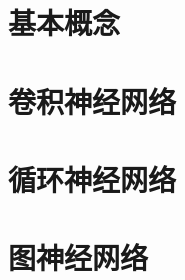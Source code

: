 \documentclass[11pt,oneside]{book}
\begin{document}


\tableofcontents
\chapter{基本概念}










\chapter{卷积神经网络}







\chapter{循环神经网络}






\chapter{图神经网络}


\begin{appendices}
	
\end{appendices}
\end{document}
